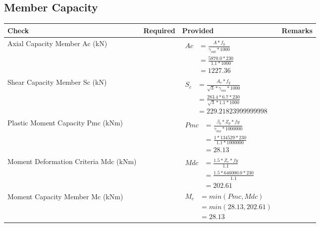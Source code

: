 \documentclass{article}%
\begin{document}
\subsection{Member Capacity}%
\label{subsec:MemberCapacity}%
\renewcommand{\arraystretch}{1.2}%
\begin{longtable}{|p{4cm}|p{5cm}|p{5.5cm}|p{1.5cm}|}%
\hline%
\rowcolor{OsdagGreen}%
Check&Required&Provided&Remarks\\%
\hline%
\endhead%
\hline%
Axial Capacity Member Ac (kN)&&$\begin{aligned} Ac &=\frac{A*f_y}{\gamma_{m0} *1000}\\ &=\frac{5870.0*230}{1.1* 1000}\\ &=1227.36\end{aligned}$&\\%
\hline%
Shear Capacity Member Sc (kN)&&$\begin{aligned} S_c &= \frac{A_v*f_y}{\sqrt{3}*\gamma_{mo} *1000}\\ &=\frac{283.4*6.7*230}{\sqrt{3}*1.1 *1000}\\ &=229.21823999999998\end{aligned}$&\\%
\hline%
Plastic Moment Capacity Pmc (kNm)&&$\begin{aligned} Pmc &= \frac{\beta_b * Z_p *fy}{\gamma_{mo} * 1000000}\\ &=\frac{1*134529*230}{1.1 * 1000000}\\ &=28.13\end{aligned}$&\\%
\hline%
Moment Deformation Criteria Mdc (kNm)&&$\begin{aligned} Mdc &= \frac{1.5 *Z_e *fy}{1.1}\\ &= \frac{1.5 *646000.0*230}{1.1}\\ &= 202.61\end{aligned}$&\\%
\hline%
Moment Capacity Member Mc (kNm)&&$\begin{aligned} M_c &= min(Pmc,Mdc)\\ &=min(28.13,202.61)\\ &=28.13\end{aligned}$&\\%
\hline%
\end{longtable}

%
\end{document}
